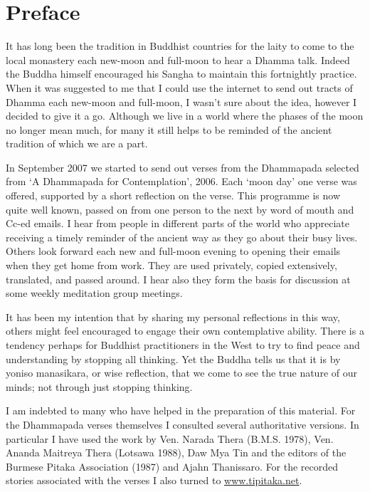 
\chapter{Preface}

It has long been the tradition in Buddhist countries for the laity to
come to the local monastery each new-moon and full-moon to hear a Dhamma
talk. Indeed the Buddha himself encouraged his Sangha to maintain this
fortnightly practice. When it was suggested to me that I could use the
internet to send out tracts of Dhamma each new-moon and full-moon, I
wasn't sure about the idea, however I decided to give it a go. Although
we live in a world where the phases of the moon no longer mean much, for
many it still helps to be reminded of the ancient tradition of which we
are a part.

In September 2007 we started to send out verses from the Dhammapada
selected from `A Dhammapada for Contemplation', 2006. Each `moon day'
one verse was offered, supported by a short reflection on the verse.
This programme is now quite well known, passed on from one person to the
next by word of mouth and Cc-ed emails. I hear from people in different
parts of the world who appreciate receiving a timely reminder of the
ancient way as they go about their busy lives. Others look forward each
new and full-moon evening to opening their emails when they get home
from work. They are used privately, copied extensively, translated, and
passed around. I hear also they form the basis for discussion at some
weekly meditation group meetings.

It has been my intention that by sharing my personal reflections in this
way, others might feel encouraged to engage their own contemplative
ability. There is a tendency perhaps for Buddhist practitioners in the
West to try to find peace and understanding by stopping all thinking.
Yet the Buddha tells us that it is by yoniso manasikara, or wise
reflection, that we come to see the true nature of our minds; not
through just stopping thinking.

I am indebted to many who have helped in the preparation of this
material. For the Dhammapada verses themselves I consulted several
authoritative versions. In particular I have used the work by Ven.
Narada Thera (B.M.S. 1978), Ven. Ananda Maitreya Thera (Lotsawa 1988),
Daw Mya Tin and the editors of the Burmese Pitaka Association (1987) and
Ajahn Thanissaro. For the recorded stories associated with the verses I
also turned to \href{http://www.tipitaka.net/}{www.tipitaka.net}.

